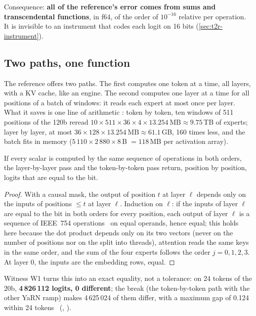 Consequence: \textbf{all of the reference's error comes from sums and transcendental functions}, in f64, of the order of $10^{-16}$ relative per operation. It is invisible to an instrument that codes each logit on 16 bits (\cref{sec:t2r-instrument}).

\subsection{Two paths, one function}\label{sec:t2r-chemins}

The reference offers two paths. The first computes one token at a time, all layers, with a KV cache, like an engine. The second computes one layer at a time for all positions of a batch of windows: it reads each expert at most once per layer. What it saves is one line of arithmetic \calc: token by token, ten windows of 511 positions of the 120b reread $10 \times 511 \times 36 \times 4 \times 13.254~\text{MB} \approx 9.75$\,TB of experts; layer by layer, at most $36 \times 128 \times 13.254~\text{MB} \approx 61.1$\,GB, 160 times less, and the batch fits in memory ($5\,110 \times 2\,880 \times 8$\,B $= 118$\,MB per activation array).

\begin{proposition}\label{prop:t2r-chemins}
If every scalar is computed by the same sequence of operations in both orders, the layer-by-layer pass and the token-by-token pass return, position by position, logits that are equal to the bit.
\end{proposition}

\begin{proof}
With a causal mask, the output of position $t$ at layer $\ell$ depends only on the inputs of positions $\le t$ at layer $\ell$. Induction on $\ell$: if the inputs of layer $\ell$ are equal to the bit in both orders for every position, each output of layer $\ell$ is a sequence of IEEE~754 operations~\cite{higham2002} on equal operands, hence equal; this holds here because the dot product depends only on its two vectors (never on the number of positions nor on the split into threads), attention reads the same keys in the same order, and the sum of the four experts follows the order $j = 0, 1, 2, 3$. At layer 0, the inputs are the embedding rows, equal.
\end{proof}

Witness W1 turns this into an exact equality, not a tolerance: on 24 tokens of the 20b, \textbf{4\,826\,112 logits, 0 different}; the break (the token-by-token path with the other YaRN ramp) makes 4\,625\,024 of them differ, with a maximum gap of 0.124 within 24 tokens \mes~(, ).


